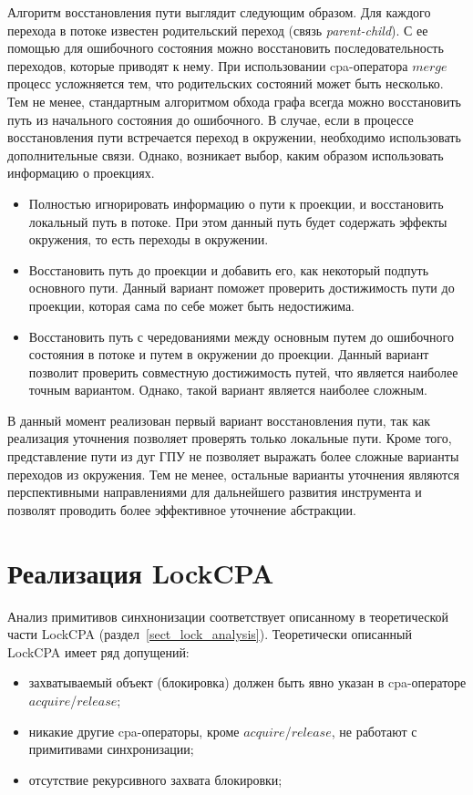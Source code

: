 Алгоритм восстановления пути выглядит следующим образом.
Для каждого перехода в потоке известен родительский переход (связь \textit{parent-child}).
С ее помощью для ошибочного состояния можно восстановить последовательность переходов, которые приводят к нему.
При использовании cpa-оператора $merge$ процесс усложняется тем, что родительских состояний может быть несколько.
Тем не менее, стандартным алгоритмом обхода графа всегда можно восстановить путь из начального состояния до ошибочного.
В случае, если в процессе восстановления пути встречается переход в окружении, необходимо использовать дополнительные связи.
Однако, возникает выбор, каким образом использовать информацию о проекциях.
\begin{itemize}
\item Полностью игнорировать информацию о пути к проекции, и восстановить локальный путь в потоке.
При этом данный путь будет содержать эффекты окружения, то есть переходы в окружении.
\item Восстановить путь до проекции и добавить его, как некоторый подпуть основного пути. 
Данный вариант поможет проверить достижимость пути до проекции, которая сама по себе может быть недостижима.
\item Восстановить путь с чередованиями между основным путем до ошибочного состояния в потоке и путем в окружении до проекции.
Данный вариант позволит проверить совместную достижимость путей, что является наиболее точным вариантом.
Однако, такой вариант является наиболее сложным.
\end{itemize}

В данный момент реализован первый вариант восстановления пути, так как реализация уточнения позволяет проверять только локальные пути. 
Кроме того, представление пути из дуг ГПУ не позволяет выражать более сложные варианты переходов из окружения.
Тем не менее, остальные варианты уточнения являются перспективными направлениями для дальнейшего развития инструмента и позволят проводить более эффективное уточнение абстракции.

\section{Реализация LockCPA}
\label{sect_impl_lock}
Анализ примитивов синхнонизации соответствует описанному в теоретической части LockCPA (раздел~\ref{sect_lock_analysis}).
Теоретически описанный LockCPA имеет ряд допущений:
\begin{itemize}
\item захватываемый объект (блокировка) должен быть явно указан в cpa-операторе $acquire$/$release$;
\item никакие другие cpa-операторы, кроме $acquire$/$release$, не работают с примитивами синхронизации;
\item отсутствие рекурсивного захвата блокировки;
\end{itemize}

